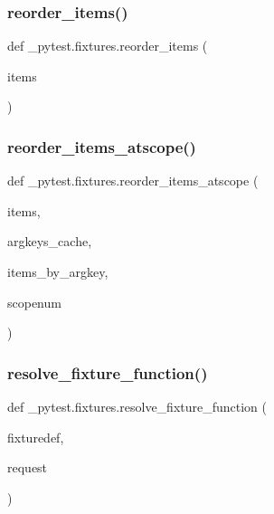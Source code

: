\subsubsection{\texorpdfstring{reorder\+\_\+items()}{reorder\_items()}}
{\footnotesize\ttfamily def \+\_\+pytest.\+fixtures.\+reorder\+\_\+items (\begin{DoxyParamCaption}\item[{}]{items }\end{DoxyParamCaption})}

\mbox{\label{namespace__pytest_1_1fixtures_a4644c7729264a65ac60b0101edb98fd7}} 
\subsubsection{\texorpdfstring{reorder\+\_\+items\+\_\+atscope()}{reorder\_items\_atscope()}}
{\footnotesize\ttfamily def \+\_\+pytest.\+fixtures.\+reorder\+\_\+items\+\_\+atscope (\begin{DoxyParamCaption}\item[{}]{items,  }\item[{}]{argkeys\+\_\+cache,  }\item[{}]{items\+\_\+by\+\_\+argkey,  }\item[{}]{scopenum }\end{DoxyParamCaption})}

\mbox{\label{namespace__pytest_1_1fixtures_a0a6fb5395a06f72a7f10b75dbf46fb21}} 
\subsubsection{\texorpdfstring{resolve\+\_\+fixture\+\_\+function()}{resolve\_fixture\_function()}}
{\footnotesize\ttfamily def \+\_\+pytest.\+fixtures.\+resolve\+\_\+fixture\+\_\+function (\begin{DoxyParamCaption}\item[{}]{fixturedef,  }\item[{}]{request }\end{DoxyParamCaption})}

